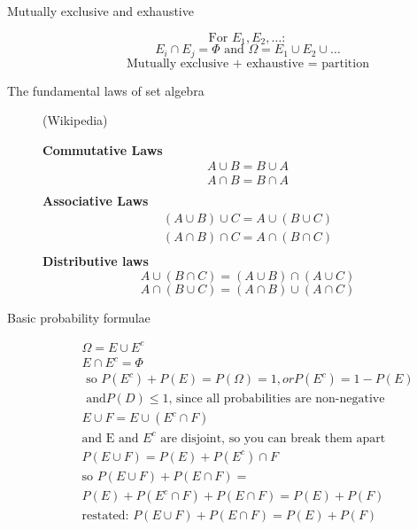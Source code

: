     \begin{description}
    	\item[Mutually exclusive and exhaustive] 
	\[ \mbox{For } E_1, E_2, \dots:  \]
	\[ E_i \cap E_j = \Phi \mbox{ and } \Omega = E_1 \cup E_2 \cup \dots \]
	\[ \mbox{ Mutually exclusive + exhaustive = partition } \]
    \end{description}
    
    \begin{description}
    \item[The fundamental laws of set algebra] {\tiny (Wikipedia)}
    
    \textbf{Commutative Laws}
    	\begin{align*}
		A \cup B = B \cup A   \\
		A \cap B = B \cap A   \\
	\end{align*}
     \textbf{Associative Laws}
    	 \begin{align*}
	   (A \cup B) \cup C = A \cup (B \cup C) \\
	   (A \cap B) \cap C = A \cap (B \cap C) \\
	\end{align*}
      \textbf{Distributive laws}
	  \[ A \cup (B \cap C) = (A \cup B) \cap (A \cup C)   \]
	  \[ A \cap (B \cup C) = (A \cap B) \cup (A \cap C) \]
    \end{description}
			
	
    \begin{description}	
        \item[Basic probability formulae] 
           \begin{gather*} 
        		\Omega = E \cup E^c \\
        		E \cap E^c = \Phi \\
      		\mbox{ so }  P(E^c) + P(E) = P(\Omega) = 1, or P(E^c) = 1-P(E) \\
        		\mbox{ and} P(D)  \leq 1 \mbox{, since all probabilities are non-negative} \\
           E \cup F = E \cup (E^c \cap F)  \\
            \mbox{and E and $E^c$ are disjoint, so you can break them apart} \\            
           P(E \cup F) = P(E) + P(E^c) \cap F \\
           \mbox{so } P(E \cup F) + P(E \cap F) =  \\ P(E) + P(E^c \cap F) + P(E \cap F) = P(E) + P(F) \\
           \mbox{restated: } P(E \cup F) + P(E \cap F) = P(E) + P(F) \\
           \end{gather*}  
    \end{description}
    
